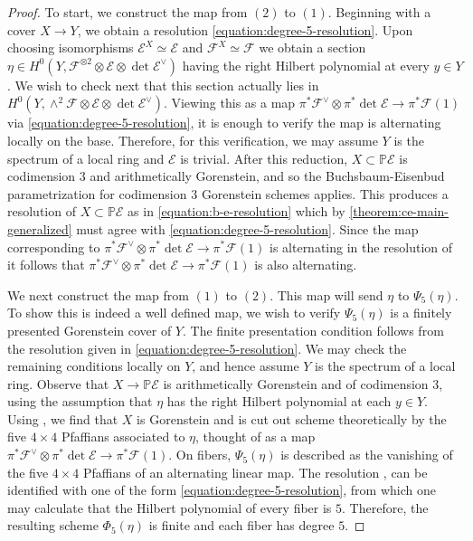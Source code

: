 \documentclass[12 pt]{amsart}
\theoremstyle{plain}
\theoremstyle{definition}
\theoremstyle{remark}
\numberwithin{equation}{section}
\newcommand\bp{\mathbb P}
\newcommand\sce{\mathscr E}
\newcommand\scf{\mathscr F}
\begin{document}
\begin{proof}
	To start, we construct the map from $(2)$ to $(1)$.
	Beginning with a cover $X \to Y$, we obtain a resolution
	\eqref{equation:degree-5-resolution}.  Upon choosing isomorphisms
	$\sce^X \simeq \sce$ and $\scf^X \simeq \scf$ we obtain a section $\eta
	\in H^0(Y, \scf^{\otimes 2} \otimes \sce \otimes \det \sce^\vee)$ having
	the right Hilbert polynomial at every $y \in Y$.  We wish to check next that
	this section actually lies in $H^0(Y, \wedge^2 \scf \otimes \sce \otimes
	\det \sce^\vee)$.  
	Viewing this as a map $\pi^*\scf^\vee \otimes \pi^*
	\det \sce \to \pi^*\scf(1)$ via \eqref{equation:degree-5-resolution}, it
	is enough to verify the map is alternating locally on the base.
	Therefore, for this verification, we may assume $Y$ is the spectrum of a
	local ring and $\sce$ is trivial.  After this reduction, $X \subset \bp
	\sce$ is codimension $3$ and arithmetically Gorenstein, and so the
	Buchsbaum-Eisenbud parametrization for codimension $3$ Gorenstein
	schemes \cite[Thm.\
	2.1(2)]{buchsbaumE:algebra-structures-for-finite-free-resolutions-codimension-3}
	applies. This produces a resolution of $X \subset \bp \sce$ as in
	\autoref{equation:b-e-resolution}
	which by \autoref{theorem:ce-main-generalized} must agree with
	\eqref{equation:degree-5-resolution}. 
	Since the map corresponding to
	$\pi^*\scf^\vee \otimes \pi^* \det \sce \to \pi^* \scf(1)$ is
	alternating in the resolution of \cite[Thm.\
	2.1(2)]{buchsbaumE:algebra-structures-for-finite-free-resolutions-codimension-3}
	it follows that $\pi^* \scf^\vee \otimes \pi^*\det \sce \to \pi^*
	\scf(1)$ is also alternating.  

	We next construct the map from $(1)$ to $(2)$.
	This map will send $\eta$ to $\Psi_5(\eta)$. To show this is indeed a
	well defined map, we wish to verify
	$\Psi_5(\eta)$ is a finitely presented Gorenstein cover of $Y$.  The
	finite presentation condition follows from the resolution given in
	\eqref{equation:degree-5-resolution}.  We may check the remaining
	conditions locally on $Y$, and hence assume $Y$ is the spectrum of a
	local ring.  Observe that $X \to \bp \sce$ is arithmetically Gorenstein
	and of codimension $3$, using the assumption that $\eta$ has the right
	Hilbert polynomial at each $ y \in Y$.  Using \cite[Thm.\
	2.1(1)]{buchsbaumE:algebra-structures-for-finite-free-resolutions-codimension-3},
	we find that $X$ is Gorenstein and is cut out scheme theoretically by
	the five $4 \times 4$ Pfaffians associated to $\eta$, thought of as a
	map $\pi^*\scf^\vee \otimes \pi^*\det \sce \to \pi^* \scf(1)$.  On
	fibers, $\Psi_5(\eta)$ is described as the vanishing of the five $4
	\times 4$ Pfaffians of an alternating linear map.  The resolution
	\cite[Thm.\
	2.1(1)]{buchsbaumE:algebra-structures-for-finite-free-resolutions-codimension-3},
	can be identified with one of the form
	\eqref{equation:degree-5-resolution}, from which one may calculate that
	the Hilbert polynomial of every fiber is $5$.  Therefore, the resulting
	scheme $\Phi_5(\eta)$ is finite and each fiber has degree $5$.


\end{proof}
\end{document}
